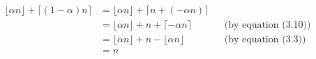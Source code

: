 \liftdisplaystyle
\begin{align*}
    \lfloor\alpha n\rfloor+\lceil(1-\alpha)n\rceil &= \lfloor\alpha n\rfloor+\lceil n+(-\alpha n)\rceil \\
     &= \lfloor\alpha n\rfloor+n+\lceil-\alpha n\rceil && \text{(by equation (3.10))} \\
     &= \lfloor\alpha n\rfloor+n-\lfloor\alpha n\rfloor && \text{(by equation (3.3))} \\
     &= n
\end{align*}

